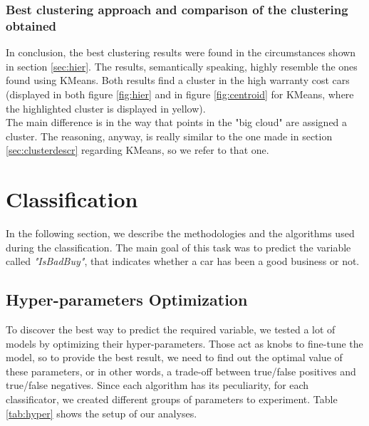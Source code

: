 \documentclass{article}
\begin{document}
	
	\subsubsection{Best clustering approach and comparison of the clustering obtained}
	In conclusion, the best clustering results were found in the circumstances shown in section \ref{sec:hier}. The results, semantically speaking, highly resemble the ones found using KMeans. Both results find a cluster in the high warranty cost cars (displayed in both figure \ref{fig:hier} and in figure \ref{fig:centroid} for KMeans, where the highlighted cluster is displayed in yellow).\\
	The main difference is in the way that points in the "big cloud" are assigned a cluster. The reasoning, anyway, is really similar to the one made in section \ref{sec:clusterdescr} regarding KMeans, so we refer to that one.
	
	
	
	
	\section{Classification}
	\label{sec:classification}
	In the following section, we describe the methodologies and the algorithms used during the classification. The main goal of this task was to predict the variable called \textit{"IsBadBuy"}, that indicates whether a car has been a good business or not.
	
	\subsection{Hyper-parameters Optimization}
	To discover the best way to predict the required variable, we tested a lot of models by optimizing their hyper-parameters. Those act as knobs to fine-tune the model, so to provide the best result, we need to find out the optimal value of these parameters, or in other words, a trade-off between true/false positives and true/false negatives. Since each algorithm has its peculiarity, for each classificator, we created different groups of parameters to experiment. Table \ref{tab:hyper} shows the setup of our analyses.
	
\end{document}
